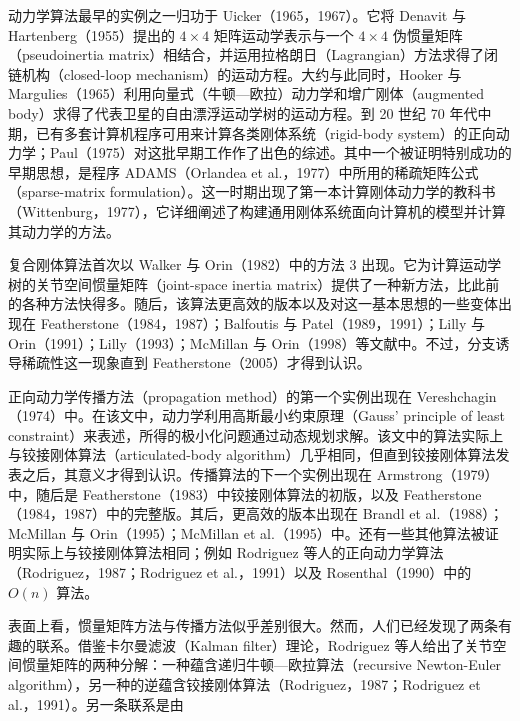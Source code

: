 \documentclass[10pt,a4paper]{book}
\theoremstyle{thmstyle} %
\theoremstyle{defstyle} %
\theoremstyle{prostyle} %
\begin{document}
动力学算法最早的实例之一归功于 Uicker（1965，1967）。它将 Denavit 与 Hartenberg（1955）提出的 $4 \times 4$ 矩阵运动学表示与一个 $4 \times 4$ 伪惯量矩阵（pseudoinertia matrix）相结合，并运用拉格朗日（Lagrangian）方法求得了闭链机构（closed-loop mechanism）的运动方程。大约与此同时，Hooker 与 Margulies（1965）利用向量式（牛顿—欧拉）动力学和增广刚体（augmented body）求得了代表卫星的自由漂浮运动学树的运动方程。到 20 世纪 70 年代中期，已有多套计算机程序可用来计算各类刚体系统（rigid-body system）的正向动力学；Paul（1975）对这批早期工作作了出色的综述。其中一个被证明特别成功的早期思想，是程序 ADAMS（Orlandea et al.，1977）中所用的稀疏矩阵公式（sparse-matrix formulation）。这一时期出现了第一本计算刚体动力学的教科书（Wittenburg，1977），它详细阐述了构建通用刚体系统面向计算机的模型并计算其动力学的方法。



复合刚体算法首次以 Walker 与 Orin（1982）中的方法 3 出现。它为计算运动学树的关节空间惯量矩阵（joint-space inertia matrix）提供了一种新方法，比此前的各种方法快得多。随后，该算法更高效的版本以及对这一基本思想的一些变体出现在 Featherstone（1984，1987）；Balfoutis 与 Patel（1989，1991）；Lilly 与 Orin（1991）；Lilly（1993）；McMillan 与 Orin（1998）等文献中。不过，分支诱导稀疏性这一现象直到 Featherstone（2005）才得到认识。



正向动力学传播方法（propagation method）的第一个实例出现在 Vereshchagin（1974）中。在该文中，动力学利用高斯最小约束原理（Gauss' principle of least constraint）来表述，所得的极小化问题通过动态规划求解。该文中的算法实际上与铰接刚体算法（articulated-body algorithm）几乎相同，但直到铰接刚体算法发表之后，其意义才得到认识。传播算法的下一个实例出现在 Armstrong（1979）中，随后是 Featherstone（1983）中铰接刚体算法的初版，以及 Featherstone（1984，1987）中的完整版。其后，更高效的版本出现在 Brandl et al.（1988）；McMillan 与 Orin（1995）；McMillan et al.（1995）中。还有一些其他算法被证明实际上与铰接刚体算法相同；例如 Rodriguez 等人的正向动力学算法（Rodriguez，1987；Rodriguez et al.，1991）以及 Rosenthal（1990）中的 $O(n)$ 算法。



表面上看，惯量矩阵方法与传播方法似乎差别很大。然而，人们已经发现了两条有趣的联系。借鉴卡尔曼滤波（Kalman filter）理论，Rodriguez 等人给出了关节空间惯量矩阵的两种分解：一种蕴含递归牛顿—欧拉算法（recursive Newton-Euler algorithm），另一种的逆蕴含铰接刚体算法（Rodriguez，1987；Rodriguez et al.，1991）。另一条联系是由
\end{document}
